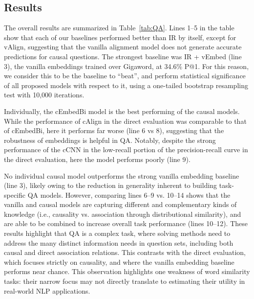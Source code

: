 \subsection{Results}
The overall results are summarized in Table~\ref{tab:QA}.
Lines 1--5 in the table show that each of our baselines performed better than IR by itself, except for vAlign, suggesting that the vanilla alignment model does not generate accurate predictions for causal questions.
The strongest baseline was IR + vEmbed (line 3), the vanilla embeddings trained over Gigaword, at 34.6\% P@1. For this reason, we consider this to be the baseline to ``beat'', and perform statistical significance of all proposed models with respect to it, using a one-tailed bootstrap resampling test with 10,000 iterations. 

Individually, the cEmbedBi model is the best performing of the causal models.  While the performance of cAlign in the direct evaluation was comparable to that of cEmbedBi, here it performs far worse (line 6 vs 8), suggesting that the robustness of embeddings is helpful in QA.  Notably, despite the strong performance of the cCNN in the low-recall portion of the precision-recall curve in the direct evaluation, here the model performs poorly (line 9).

No individual causal model outperforms the strong vanilla embedding baseline (line 3), likely owing to the reduction in generality inherent to building task-specific QA models.
However, comparing lines 6--9 vs. 10--14 shows that the vanilla and causal models are capturing different and complementary kinds of knowledge (i.e., causality vs. association through distributional similarity), and are able to be combined to increase overall task performance (lines 10--12).  These results highlight that QA is a complex task, where solving methods need to address the many distinct information needs in question sets, including both causal and direct association relations.  This contrasts with the direct evaluation, which focuses strictly on causality, and where the vanilla embedding baseline performs near chance. This observation highlights one weakness of word similarity tasks: their narrow focus may not directly translate to estimating their utility in real-world NLP applications. %

